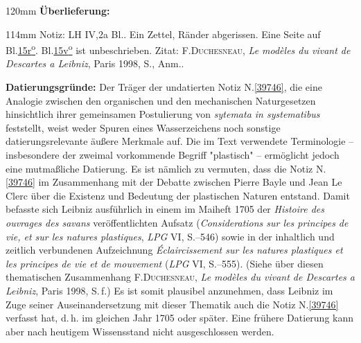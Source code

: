%
\frenchspacing%
\begin{ledgroupsized}[r]{120mm}%
\footnotesize%
\pstart%
\noindent%
\textbf{Überlieferung:}%
\pend%
\end{ledgroupsized}%
\begin{ledgroupsized}[r]{114mm}%
\footnotesize%
\pstart%
\parindent -6mm%
%
Notiz:
LH IV,\;2a Bl..
Ein Zettel, %
Ränder abgerissen.
Eine Seite auf Bl.\;\href{\Scan{LH_04_01_02a_015r}}{15\:r\textsuperscript{o}}.
Bl.\;\href{\Scan{LH_04_01_02a_015v}}{15\:v\textsuperscript{o}}
ist unbeschrieben.
\pend%
\pstart%
\parindent -6mm%
%
Zitat:
\textsc{F.\;Duchesneau}, \textit{Le modèles du vivant de Descartes a Leibniz}, Paris 1998, S., Anm..\cite{02588}
\pend%
\end{ledgroupsized}%
\vspace{5mm}%
\begin{ledgroup}%
\footnotesize%
\pstart%
\noindent%
\textbf{Datierungsgründe:}
Der Träger der undatierten Notiz N.\;\ref{39746}, die eine Analogie zwischen den organischen und den mechanischen Naturgesetzen hinsichtlich ihrer gemeinsamen Postulierung von \textit{sytemata in systematibus} feststellt, weist weder Spuren eines Wasserzeichens noch sonstige datierungsrelevante äußere Merkmale auf.
Die im Text verwendete Terminologie -- insbesondere der zweimal vorkommende Begriff "plastisch" -- ermöglicht jedoch eine mutmaßliche Datierung.
Es ist nämlich zu vermuten, dass die Notiz N.\;\ref{39746} im Zusammenhang mit der Debatte zwischen Pierre Bayle und Jean Le Clerc über die Existenz und Bedeutung der plastischen Naturen entstand.
Damit befasste sich Leibniz ausführlich in einem im Maiheft 1705 der \textit{Histoire des ouvrages des savans} veröffentlichten Aufsatz (\textit{Considerations sur les principes de vie, et sur les natures plastiques}, \textit{LPG} VI, S.--546)\cite{02589}\cite{02039} sowie in der inhaltlich und zeitlich verbundenen Aufzeichnung \textit{Éclaircissement sur les natures plastiques et les principes de vie et de mouvement} (\textit{LPG} VI, S.--555).\cite{02590}
(Siehe über diesen thematischen Zusammenhang \textsc{F.\;Duchesneau}, \textit{Le modèles du vivant de Descartes a Leibniz}, Paris 1998, S.\,f.)\cite{02588}
Es ist somit plausibel anzunehmen, dass Leibniz im Zuge seiner Auseinandersetzung mit dieser Thematik auch die Notiz N.\;\ref{39746} verfasst hat, d.\,h. im gleichen Jahr 1705 oder später.
Eine frühere Datierung kann aber nach heutigem Wissensstand nicht ausgeschlossen werden.
\pend%
\end{ledgroup}%
